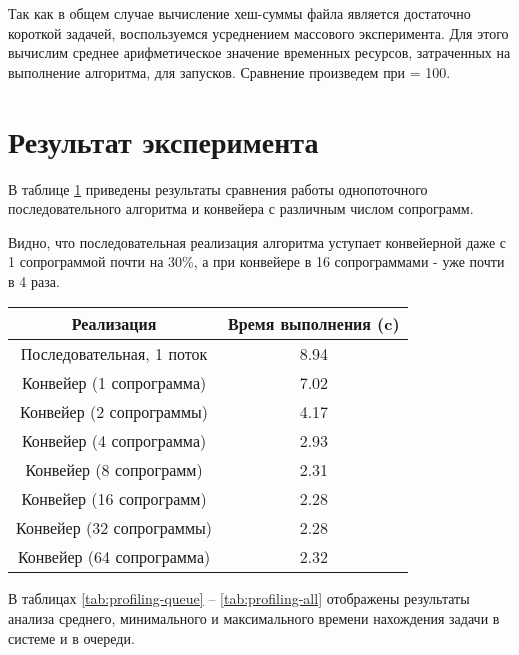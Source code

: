 Так как в общем случае вычисление хеш-суммы файла является достаточно короткой задачей, 
воспользуемся усреднением массового эксперимента. Для этого вычислим среднее
арифметическое значение временных ресурсов, затраченных на выполнение алгоритма, для
 запусков. Сравнение произведем при  = 100.


\section{Результат эксперимента}

В таблице \ref{tab:profiling-1} приведены результаты сравнения работы однопоточного последовательного алгоритма и конвейера с
различным числом сопрограмм.

Видно, что последовательная реализация алгоритма уступает конвейерной даже с 1 сопрограммой почти на 30\%,
 а при конвейере в 16 сопрограммами - уже почти в 4 раза.

\begin{table}[!htb]
	\begin{center}
		\begin{tabular}{|c|c|} 
			\hline
			Реализация & Время выполнения (c)  \\  
			\hline
			Последовательная, 1 поток & 8.94  \\
			\hline
			Конвейер (1 сопрограмма) & 7.02  \\
			\hline
			Конвейер (2 сопрограммы) & 4.17  \\
			\hline
			Конвейер (4 сопрограмма) & 2.93   \\
			\hline
			Конвейер (8 сопрограмм) & 2.31 \\
			\hline
			Конвейер (16 сопрограмм) & 2.28 \\
			\hline
			Конвейер (32 сопрограммы) & 2.28  \\
			\hline
			Конвейер (64 сопрограмма) & 2.32 \\
			\hline
		\end{tabular}
		\label{tab:profiling-1}
	\end{center}
\end{table}

В таблицах \ref{tab:profiling-queue} -- \ref{tab:profiling-all} отображены результаты анализа среднего, минимального 
и максимального времени нахождения задачи в системе и в очереди.



